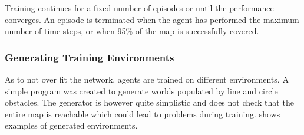 Training continues for a fixed number of episodes or until the performance converges. An episode is terminated when the agent has performed the maximum number of time steps, or when 95\% of the map is successfully covered.

\subsubsection{Generating Training Environments}
As to not over fit the network, agents are trained on different environments. A simple program was created to generate worlds populated by line and circle obstacles. The generator is however quite simplistic and does not check that the entire map is reachable which could lead to problems during training.  shows examples of generated environments. 

